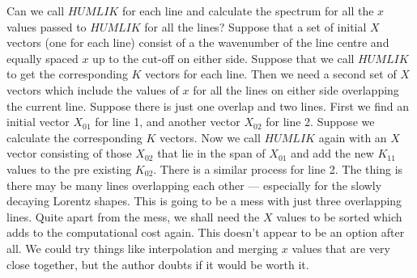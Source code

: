 \documentclass[12pt]{article}
\begin{document}
Can we call $HUMLIK$ for each line and calculate the spectrum {for all the $x$ values
passed to $HUMLIK$ for all the lines}? Suppose that a set of initial $X$ vectors (one for each line)
consist of a
the wavenumber of the line centre and equally spaced $x$ up to the cut-off on either side.
Suppose that we call $HUMLIK$ to get the corresponding $K$ vectors for each line.
Then we need a second set of  $X$ vectors which include the values of $x$ for all the lines
on either side overlapping the current line. Suppose there is just one overlap and two lines.
First we find an initial vector $X_{01}$ for line 1, and another vector $X_{02}$ for line 2. Suppose we calculate the
corresponding $K$ vectors. Now we call $HUMLIK$ again with an $X$ vector consisting of those
$X_{02}$ that lie in the span of $X_{01}$ and add the new $K_{11}$ values to the pre existing $K_{02}$.
There is a similar process for line 2. The thing is there may be many lines overlapping each other
 --- especially for the slowly decaying Lorentz shapes. This is going to be a mess with just three
overlapping lines. Quite apart from the mess, we shall need the $X$ values to be sorted which adds
to the computational cost again. This doesn't appear to be an option after all. We could try
things like interpolation and merging $x$ values that are very close together, but the author doubts
 if it would be worth it.
\end{document}

